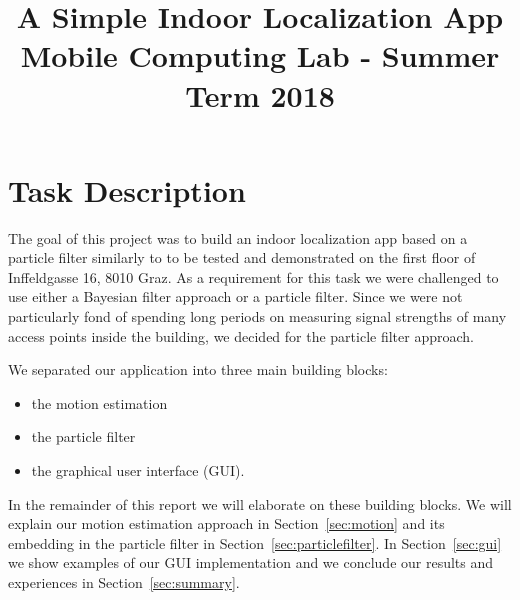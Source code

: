 \documentclass[conference]{IEEEtran}
\begin{document}
\title{A Simple Indoor Localization App\\
{\large Mobile Computing Lab - Summer Term 2018}
}

\author{
\and
{}
}

\maketitle


\section{Task Description}
The goal of this project was to build an indoor localization app based on a particle filter \cite{particlefilter} similarly to \cite{zee} to be tested and demonstrated on the first floor of Inffeldgasse 16, 8010 Graz. As a requirement for this task we were challenged to use either a Bayesian filter approach or a particle filter. Since we were not particularly fond of spending long periods on measuring signal strengths of many access points inside the building, we decided for the particle filter approach. 

We separated our application into three main building blocks:
\begin{itemize}
\item the motion estimation
\item the particle filter
\item the graphical user interface (GUI).
\end{itemize}

In the remainder of this report we will elaborate on these building blocks. We will explain our motion estimation approach in Section~\ref{sec:motion} and its embedding in the particle filter in Section~\ref{sec:particlefilter}. In Section~\ref{sec:gui} we show examples of our GUI implementation and we conclude our results and experiences in Section~\ref{sec:summary}.
\end{document}
